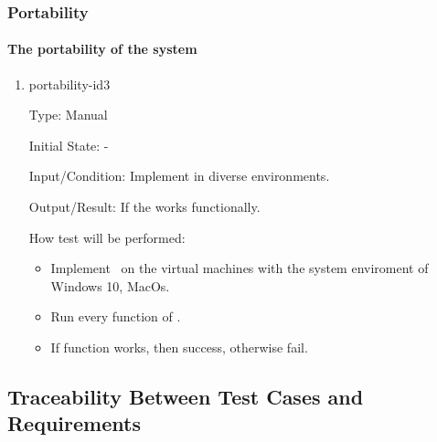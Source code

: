 \documentclass[12pt, titlepage]{article}
\begin{document}
\subsubsection{Portability} 
\paragraph{The portability of the system}
\begin{enumerate}

\item{portability-id3\\}

Type: Manual
					
Initial State: -
					
Input/Condition: Implement \progname in diverse environments.
					
Output/Result: If the \progname works functionally.
					
How test will be performed:
 \begin{itemize}
\item Implement \progname ~on the
virtual machines with the system enviroment of Windows 10, MacOs. 
\item Run every function of \progname. 
\item If function works, then success, otherwise fail. 
\end{itemize} 
\end{enumerate}


\newpage
\subsection{Traceability Between Test Cases and Requirements}
\end{document}
